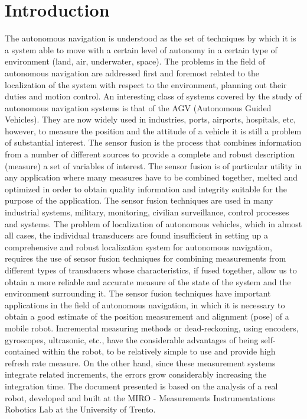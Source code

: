 \section{Introduction}
The autonomous navigation is understood as the set of techniques by which it is a system able to move with a certain level of autonomy in a certain type of environment (land, air, underwater, space). The problems in the field of autonomous navigation are addressed first and foremost related to the localization of the system with respect to the environment, planning out their duties and motion control.
An interesting class of systems covered by the study of autonomous navigation systems is that of the AGV (Autonomous Guided Vehicles). They are now widely used in industries, ports, airports, hospitals, etc, however, to measure the position and the attitude of a vehicle it is still a problem of substantial interest.
The sensor fusion is the process that combines information from a number of different sources to provide a complete and robust description (measure) a set of variables of interest. The sensor fusion is of particular utility in any application where many measures have to be combined together, melted and optimized in order to obtain quality information and integrity suitable for the purpose of the application. The sensor fusion techniques are used in many industrial systems, military, monitoring, civilian surveillance, control processes and systems. The problem of localization of autonomous vehicles, which in almost all cases, the individual transducers are found insufficient in setting up a comprehensive and robust localization system for autonomous navigation, requires the use of sensor fusion techniques for combining measurements from different types of transducers whose characteristics, if fused together, allow us to obtain a more reliable and accurate measure of the state of the system and the environment surrounding it.
The sensor fusion techniques have important applications in the field of autonomous navigation, in which it is necessary to obtain a good estimate of the position measurement and alignment (pose) of a mobile robot. Incremental measuring methods or dead-reckoning, using encoders, gyroscopes, ultrasonic, etc., have the considerable advantages of being self-contained within the robot, to be relatively simple to use and provide high refresh rate measure. On the other hand, since these measurement systems integrate related increments, the errors grow considerably increasing the integration time.
The document presented is based on the analysis of a real robot, developed and built at the MIRO - Measurements Instrumentations Robotics Lab at the University of Trento.
